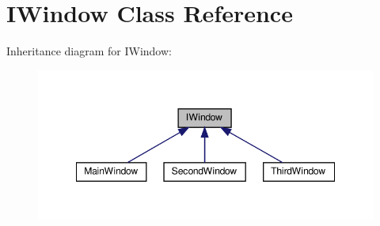 \hypertarget{classIWindow}{}\section{I\+Window Class Reference}
\label{classIWindow}


Inheritance diagram for I\+Window\+:
\nopagebreak
\begin{figure}[H]
\begin{center}
\leavevmode
\includegraphics[width=349pt]{classIWindow__inherit__graph}
\end{center}
\end{figure}
